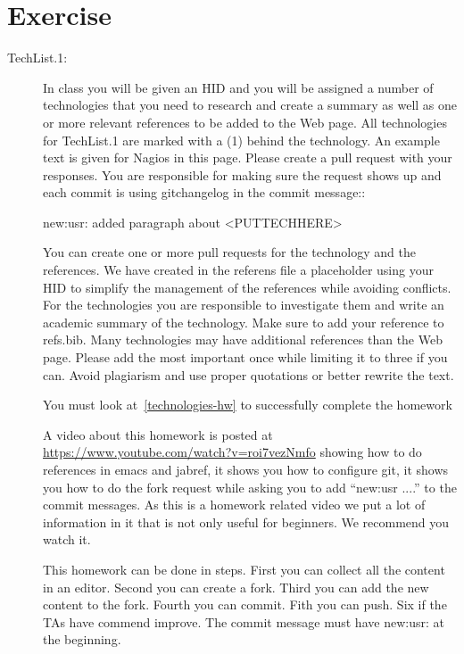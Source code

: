 \section{Exercise}

\begin{description}

\item[TechList.1:] In class you will be given an HID and you will be assigned
  a number of technologies that you need to research and create a
  summary as well as one or more relevant references to be added to the
  Web page. All technologies for TechList.1 are marked with a (1)
  behind the technology.  An example text is given for Nagios in this
  page.  Please create a pull request with your responses. You are
  responsible for making sure the request shows up and each commit is
  using gitchangelog in the commit message::

    new:usr: added paragraph about <PUTTECHHERE>

  You can create one or more pull requests for the technology and the
  references. We have created in the referens file a placeholder using
  your HID to simplify the management of the references while avoiding
  conflicts.  For the technologies you are responsible to investigate
  them and write an academic summary of the technology. Make sure to
  add your reference to refs.bib.  Many technologies may have
  additional references than the Web page. Please add the most
  important once while limiting it to three if you can. Avoid
  plagiarism and use proper quotations or better rewrite the text.

  You must look at~\ref{technologies-hw} to successfully complete the
  homework

  A video about this homework is posted at
  \url{https://www.youtube.com/watch?v=roi7vezNmfo} showing how to
  do references in emacs and jabref, it shows you how to configure
  git, it shows you how to do the fork request while asking you to add
  ``new:usr ....'' to the commit messages. As this is a homework
  related video we put a lot of information in it that is not only
  useful for beginners. We recommend you watch it.


  This homework can be done in steps. First you can collect all the
  content in an editor. Second you can create a fork. Third you can
  add the new content to the fork. Fourth you can commit. Fith you
  can push. Six if the TAs have commend improve. The commit message
  must have new:usr: at the beginning.


\end{description}
